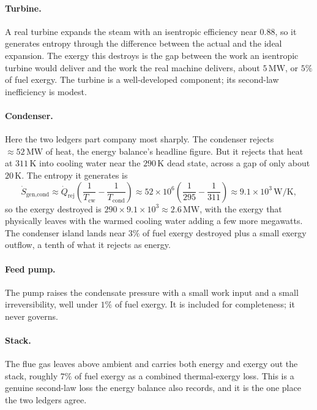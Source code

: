 \paragraph{Turbine.} A real turbine expands the steam with an isentropic
efficiency near $0.88$, so it generates entropy through the difference
between the actual and the ideal expansion. The exergy this destroys is
the gap between the work an isentropic turbine would deliver and the work
the real machine delivers, about $5\,\text{MW}$, or $5\%$ of fuel
exergy. The turbine is a well-developed component; its second-law
inefficiency is modest.

\paragraph{Condenser.} Here the two ledgers part company most sharply.
The condenser rejects $\approx 52\,\text{MW}$ of heat, the energy
balance's headline figure. But it rejects that heat at $311\,\si{\kelvin}$
into cooling water near the $290\,\si{\kelvin}$ dead state, across a gap
of only about $20\,\si{\kelvin}$. The entropy it generates is
\[
\dot S_{\text{gen,cond}} \approx \dot Q_{\text{rej}}
\left(\frac{1}{T_{\text{cw}}} - \frac{1}{T_{\text{cond}}}\right)
\approx 52\times10^6\left(\frac{1}{295} - \frac{1}{311}\right)
\approx 9.1\times10^3\,\si{\watt\per\kelvin},
\]
so the exergy destroyed is $290 \times 9.1\times10^3 \approx
2.6\,\text{MW}$, with the exergy that physically leaves with the warmed
cooling water adding a few more megawatts. The condenser island lands
near $3\%$ of fuel exergy destroyed plus a small exergy outflow, a tenth
of what it rejects as energy.

\paragraph{Feed pump.} The pump raises the condensate pressure with a
small work input and a small irreversibility, well under $1\%$ of fuel
exergy. It is included for completeness; it never governs.

\paragraph{Stack.} The flue gas leaves above ambient and carries both
energy and exergy out the stack, roughly $7\%$ of fuel exergy as a
combined thermal-exergy loss. This is a genuine second-law loss the
energy balance also records, and it is the one place the two ledgers
agree.

